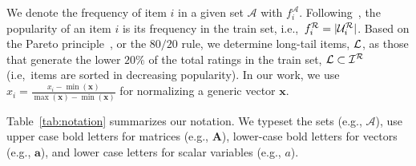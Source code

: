We denote the frequency of item $i$ in a given set $\mathcal{A}$ with $f_i^{\mathcal{A}}$. Following~\cite{adomavicius2012improving}, the popularity of an item $i$  is its frequency in the train set, i.e.,~$f_i^{\mathcal{R}} = |\mathcal{U}_{i}^{\mathcal{R}}|$. Based on the Pareto  principle~\cite{yin2012challenging}, or the $80/20$ rule,  we  determine long-tail items, $\mathcal{L}$,  as those that generate the lower $20\%$ of the total ratings in the train set,  $ \mathcal{L} \subset \mathcal{I}^{\mathcal{R}}$ (i.e,~items are sorted in decreasing popularity).
In our work, we use $x_i = \frac{ x_i - \min(\mathbf{x}) }{ \max(\mathbf{x}) - \min(\mathbf{x}) }
$ for normalizing a generic vector $\mathbf{x}$. 

\iffullpaper
Table~\ref{tab:notation} summarizes our notation. 
We  typeset the sets (e.g., $\mathcal{A}$), use upper case bold letters for matrices (e.g., $\mathbf{A}$),  lower-case bold letters for vectors (e.g., $\mathbf{a}$), and lower case letters for scalar variables (e.g., $a$). %

